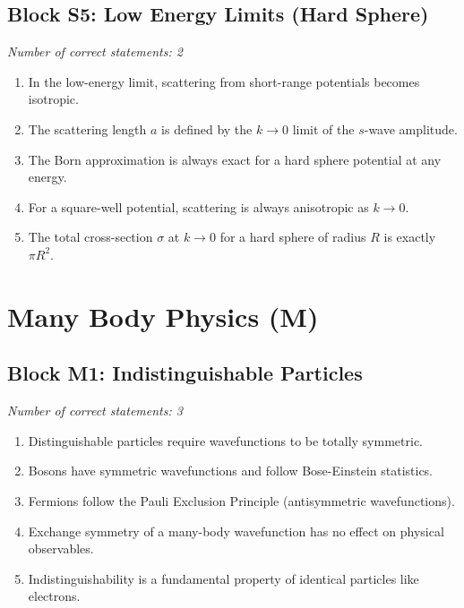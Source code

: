 \documentclass[a4paper,12pt]{article}
\begin{document}
\subsection*{Block S5: Low Energy Limits (Hard Sphere)}
\textit{Number of correct statements: 2}
\begin{enumerate}[label=\roman*.]
    \item In the low-energy limit, scattering from short-range potentials becomes isotropic.
    \item The scattering length $a$ is defined by the $k \to 0$ limit of the $s$-wave amplitude.
    \item The Born approximation is always exact for a hard sphere potential at any energy.
    \item For a square-well potential, scattering is always anisotropic as $k \to 0$.
    \item The total cross-section $\sigma$ at $k \to 0$ for a hard sphere of radius $R$ is exactly $\pi R^2$.
\end{enumerate}

\newpage

\section{Many Body Physics (M)}

\subsection*{Block M1: Indistinguishable Particles}
\textit{Number of correct statements: 3}
\begin{enumerate}[label=\roman*.]
    \item Distinguishable particles require wavefunctions to be totally symmetric.
    \item Bosons have symmetric wavefunctions and follow Bose-Einstein statistics.
    \item Fermions follow the Pauli Exclusion Principle (antisymmetric wavefunctions).
    \item Exchange symmetry of a many-body wavefunction has no effect on physical observables.
    \item Indistinguishability is a fundamental property of identical particles like electrons.
\end{enumerate}
\end{document}
